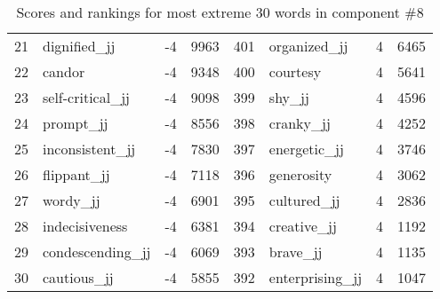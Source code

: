 \begin{table}[tbp]
\begin{tabular}{| rlr@{.}l | rlr@{.}l |}
    21 & dignified\_jj & -4 & 9963    &    401 & organized\_jj & 4 & 6465 \\
    22 & candor & -4 & 9348    &    400 & courtesy & 4 & 5641 \\
    23 & self-critical\_jj & -4 & 9098    &    399 & shy\_jj & 4 & 4596 \\
    24 & prompt\_jj & -4 & 8556    &    398 & cranky\_jj & 4 & 4252 \\
    25 & inconsistent\_jj & -4 & 7830    &    397 & energetic\_jj & 4 & 3746 \\
    26 & flippant\_jj & -4 & 7118    &    396 & generosity & 4 & 3062 \\
    27 & wordy\_jj & -4 & 6901    &    395 & cultured\_jj & 4 & 2836 \\
    28 & indecisiveness & -4 & 6381    &    394 & creative\_jj & 4 & 1192 \\
    29 & condescending\_jj & -4 & 6069    &    393 & brave\_jj & 4 & 1135 \\
    30 & cautious\_jj & -4 & 5855    &    392 & enterprising\_jj & 4 & 1047 \\
    \hline
    \end{tabular}
    \caption{Scores and rankings for most extreme 30 words in component \#8} 
\end{table}
\clearpage
